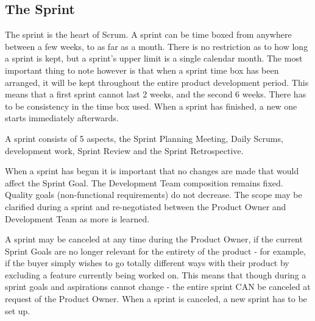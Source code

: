 \subsection{The Sprint}


The sprint is the heart of Scrum. A sprint can be time boxed from anywhere between a few weeks, to as far as a month. There is no restriction as to how long a sprint is kept, but a sprint's upper limit is a single calendar month\cite{scrumguide11}. The most important thing to note however is that when a sprint time box has been arranged, it will be kept throughout the entire product development period\cite{scrumguide11}. This means that a first sprint cannot last 2 weeks, and the second 6 weeks. There has to be consistency in the time box used\cite{scrumguide11}. When a sprint has finished, a new one starts immediately afterwards\cite{scrumguide11}.


A sprint consists of 5 aspects, the Sprint Planning Meeting, Daily Scrums, development work, Sprint Review and the Sprint Retrospective\cite{scrumguide11}. 


When a sprint has begun it is important that no changes are made that would affect the Sprint Goal\cite{scrumguide11}. The Development Team composition remains fixed. Quality goals (non-functional requirements) do not decrease\cite{scrumguide11}. The scope may be clarified during a sprint and re-negotiated between the Product Owner and Development Team as more is learned\cite{scrumguide11}. 


A sprint may be canceled at any time during the Product Owner, if the current Sprint Goals are no longer relevant for the entirety of the product - for example, if the buyer simply wishes to go totally different ways with their product by excluding a feature currently being worked on\cite{scrumguide11}. This means that though during a sprint goals and aspirations cannot change - the entire sprint CAN be canceled at request of the Product Owner\cite{scrumguide11}. When a sprint is canceled, a new sprint has to be set up\cite{scrumguide11}.



